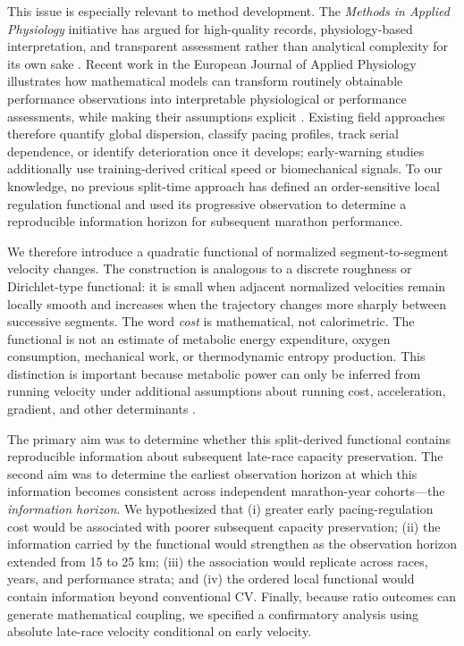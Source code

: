 \documentclass[pdflatex,sn-basic]{sn-jnl}
\begin{document}
This issue is especially relevant to method development. The \emph{Methods in Applied Physiology} initiative has argued for high-quality records, physiology-based interpretation, and transparent assessment rather than analytical complexity for its own sake \citep{Westerblad2025}. Recent work in the European Journal of Applied Physiology illustrates how mathematical models can transform routinely obtainable performance observations into interpretable physiological or performance assessments, while making their assumptions explicit \citep{Drake2024,Briand2025,WahlJi2026}. Existing field approaches therefore quantify global dispersion, classify pacing profiles, track serial dependence, or identify deterioration once it develops; early-warning studies additionally use training-derived critical speed or biomechanical signals. To our knowledge, no previous split-time approach has defined an order-sensitive local regulation functional and used its progressive observation to determine a reproducible information horizon for subsequent marathon performance.

We therefore introduce a quadratic functional of normalized segment-to-segment velocity changes. The construction is analogous to a discrete roughness or Dirichlet-type functional: it is small when adjacent normalized velocities remain locally smooth and increases when the trajectory changes more sharply between successive segments. The word \emph{cost} is mathematical, not calorimetric. The functional is not an estimate of metabolic energy expenditure, oxygen consumption, mechanical work, or thermodynamic entropy production. This distinction is important because metabolic power can only be inferred from running velocity under additional assumptions about running cost, acceleration, gradient, and other determinants \citep{Briand2025}.

The primary aim was to determine whether this split-derived functional contains reproducible information about subsequent late-race capacity preservation. The second aim was to determine the earliest observation horizon at which this information becomes consistent across independent marathon-year cohorts---the \emph{information horizon}. We hypothesized that (i) greater early pacing-regulation cost would be associated with poorer subsequent capacity preservation; (ii) the information carried by the functional would strengthen as the observation horizon extended from 15 to 25 km; (iii) the association would replicate across races, years, and performance strata; and (iv) the ordered local functional would contain information beyond conventional CV. Finally, because ratio outcomes can generate mathematical coupling, we specified a confirmatory analysis using absolute late-race velocity conditional on early velocity.
\end{document}
